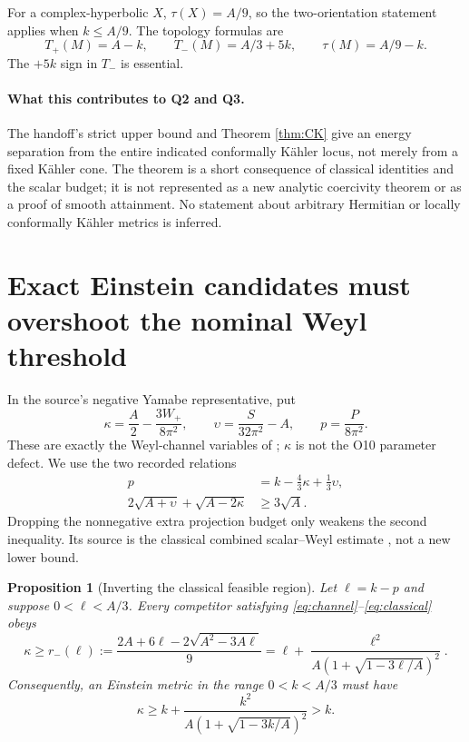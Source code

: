 \documentclass[11pt,a4paper]{article}
\numberwithin{equation}{section}
\newtheorem{proposition}[theorem]{Proposition}
\theoremstyle{definition}\newtheorem{hypothesis}[theorem]{Input}
\theoremstyle{remark}\newtheorem{remark}[theorem]{Remark}
\begin{document}
For a complex-hyperbolic $X$, $\tau(X)=A/9$, so the two-orientation statement
applies when $k\le A/9$.  The topology formulas are
\[
 T_+(M)=A-k,\qquad T_-(M)=A/3+5k,\qquad \tau(M)=A/9-k.
\]
The $+5k$ sign in $T_-$ is essential.

\paragraph{What this contributes to Q2 and Q3.}
The handoff's strict upper bound and Theorem \ref{thm:CK} give an energy
separation from the entire indicated conformally K\"ahler locus, not merely
from a fixed K\"ahler cone.  The theorem is a short consequence of classical
identities and the scalar budget; it is not represented as a new analytic
coercivity theorem or as a proof of smooth attainment.  No statement about
arbitrary Hermitian or locally conformally K\"ahler metrics is inferred.

\section{Exact Einstein candidates must overshoot the nominal Weyl threshold}

In the source's negative Yamabe representative, put
\begin{equation}
 \kappa=\frac A2-\frac{3W_+}{8\pi^2},\qquad
 \upsilon=\frac{S}{32\pi^2}-A,\qquad p=\frac P{8\pi^2}.
\end{equation}
These are exactly the Weyl-channel variables of
\cite[Section 7]{Synthesis}; $\kappa$ is not the O10 parameter defect.
We use the two recorded relations
\begin{align}
 p&=k-\frac43\kappa+\frac13\upsilon,\label{eq:channel}\\
 2\sqrt{A+\upsilon}+\sqrt{A-2\kappa}&\ge3\sqrt A.
 \label{eq:classical}
\end{align}
Dropping the nonnegative extra projection budget only weakens the second
inequality.  Its source is the classical combined scalar--Weyl estimate
\cite{LeBrun}, not a new lower bound.

\begin{proposition}[Inverting the classical feasible region]\label{prop:overshoot}
Let $\ell=k-p$ and suppose $0<\ell<A/3$.  Every competitor satisfying
\eqref{eq:channel}--\eqref{eq:classical} obeys
\begin{equation}\label{eq:overshoot}
 \boxed{\kappa\ge r_-(\ell)
 :=\frac{2A+6\ell-2\sqrt{A^2-3A\ell}}9
 =\ell+\frac{\ell^2}{A(1+\sqrt{1-3\ell/A})^2}.}
\end{equation}
Consequently, an Einstein metric in the range $0<k<A/3$ must have
\begin{equation}\label{eq:Einsteinkappa}
 \boxed{\kappa\ge k+
 \frac{k^2}{A(1+\sqrt{1-3k/A})^2}>k.}
\end{equation}
\end{proposition}
\end{document}
